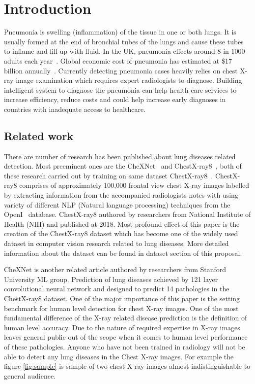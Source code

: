 \chapter{Introduction} \label{chap:introduction}

Pneumonia is swelling (inflammation) of the tissue in one or both lungs. It is usually formed at the end of bronchial tubes of the lungs and cause these tubes to inflame and fill up with fluid. In the UK, pneumonia effects around 8 in 1000 adults each year~\cite{nhs}. Global economic cost of pneumonia has estimated at \$17 billion annually~\cite{cost}. Currently detecting pneumonia cases heavily relies on chest X-ray image examination which requires expert radiologists to diagnose. Building intelligent system to diagnose the pneumonia can help  health care services to increase efficiency, reduce costs and could help increase early diagnoses in countries with inadequate access to healthcare.

\section{Related work} \label{sec:relatedwork}

There are number of research has been published about lung diseases related detection. Most preeminent ones are the CheXNet~\cite{CheXNetRP} and ChestX-ray8~\cite{ChestX-ray8}, both of these research carried out by training on same dataset ChestX-ray8~\cite{ChestX-ray8}. ChestX-ray8 comprises of approximately 100,000 frontal view chest X-ray images labelled by extracting information from the accompanied radiologists notes with using variety of different NLP (Natural language processing) techniques from the OpenI~\cite{openi} database. ChestX-ray8 authored by researchers from National Institute of Health (NIH) and published at 2018.
Most profound effect of this paper is the creation of the ChestX-ray8 dataset which has become one of the widely used dataset in computer vision research related to lung diseases. More detailed information about the dataset can be found in dataset section of this proposal. 

CheXNet is another related article authored by researchers from Stanford University ML group. Prediction of lung diseases achieved by 121 layer convolutional neural network and designed to predict 14 pathologies in the ChestX-ray8 dataset. One of the major importance of this paper is the setting benchmark for human level detection for chest X-ray images. One of the most fundamental difference of the X-ray related disease prediction is the definition of human level accuracy. Due to the nature of required expertise in X-ray images leaves general public out of the scope when it comes to human level performance of these pathologies. Anyone who have not been trained in radiology will not be able to detect any lung diseases in the Chest X-ray images. For example the figure \ref{fig:sample} is sample of two chest X-ray images almost indistinguishable to general audience.

